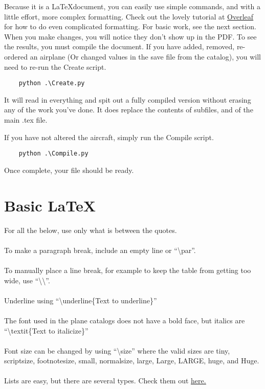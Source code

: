 \documentclass{article}
\begin{document}
Because it is a \LaTeX document, you can easily use simple commands, and with a little effort, more complex formatting.  Check out the lovely tutorial at \href{https://overleaf.com/learn/latex/Paragraphs_and_new_lines}{\color{blue}\underline{Overleaf}} for how to do even complicated formatting.  For basic work, see the next section.
When you make changes, you will notice they don't show up in the PDF.  To see the results, you must compile the document.  If you have added, removed, re-ordered an airplane (Or changed values in the save file from the catalog), you will need to re-run the Create script.
\begin{verbatim}
    python .\Create.py
\end{verbatim}
It will read in everything and spit out a fully compiled version without erasing any of the work you've done.  It does replace the contents of subfiles, and of the main .tex file.

If you have not altered the aircraft, simply run the Compile script.
\begin{verbatim}
    python .\Compile.py
\end{verbatim}
Once complete, your file should be ready.
\section{Basic \LaTeX}
For all the below, use only what is between the quotes.
\\\\
\setlength{\parindent}{0em}
To make a paragraph break, include an empty line or ``\textbackslash par''.
\\\\
To manually place a line break, for example to keep the table from getting too wide, use ``\textbackslash\textbackslash''.
\\\\
Underline using ``\textbackslash underline\{Text to underline\}''
\\\\
The font used in the plane catalogs does not have a bold face, but italics are ``\textbackslash textit\{Text to italicize\}''
\\\\
Font size can be changed by using ``\textbackslash size'' where the valid sizes are tiny, scriptsize, footnotesize, small, normalsize, large, Large, LARGE, huge, and Huge.
\\\\
Lists are easy, but there are several types.  Check them out \href{https://www.overleaf.com/learn/latex/Lists}{\color{blue}\underline{here.}}
\end{document}
